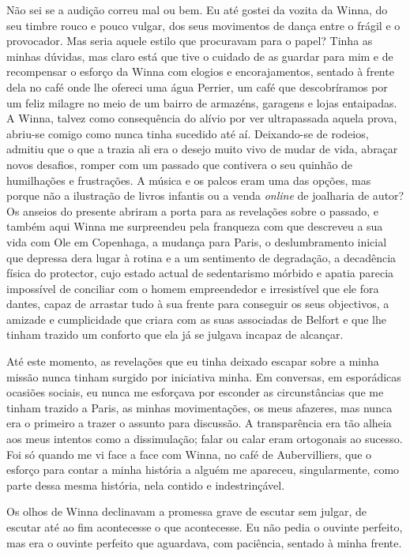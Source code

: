 Não sei se a audição correu mal ou bem. Eu até gostei da vozita da
Winna, do seu timbre rouco e pouco vulgar, dos seus movimentos de dança
entre o frágil e o provocador. Mas seria aquele estilo que procuravam
para o papel? Tinha as minhas dúvidas, mas claro está que tive o cuidado
de as guardar para mim e de recompensar o esforço da Winna com elogios e
encorajamentos, sentado à frente dela no café onde lhe ofereci uma água
Perrier, um café que descobríramos por um feliz milagre no meio de um
bairro de armazéns, garagens e lojas entaipadas. A Winna, talvez como
consequência do alívio por ver ultrapassada aquela prova, abriu-se
comigo como nunca tinha sucedido até aí. Deixando-se de rodeios, admitiu
que o que a trazia ali era o desejo muito vivo de mudar de vida,
abraçar novos desafios, romper com um passado que contivera o seu
quinhão de humilhações e frustrações. A música e os palcos eram uma das
opções, mas porque não a ilustração de livros infantis ou a venda
\emph{online }de joalharia de autor? Os anseios do presente abriram a
porta para as revelações sobre o passado, e também aqui Winna me
surpreendeu pela franqueza com que descreveu a sua vida com Ole em
Copenhaga, a mudança para Paris, o deslumbramento inicial que depressa
dera lugar à rotina e a um sentimento de degradação,
a decadência física do protector, cujo estado actual de
sedentarismo mórbido e apatia parecia impossível de conciliar com o
homem empreendedor e irresistível que ele fora dantes, capaz de arrastar
tudo à sua frente para conseguir os seus objectivos, a amizade e
cumplicidade que criara com as suas associadas de Belfort e que lhe
tinham trazido um conforto que ela já se julgava incapaz de alcançar.

Até este momento, as revelações que eu tinha deixado escapar sobre a
minha missão nunca tinham surgido por iniciativa minha. Em conversas,
em esporádicas ocasiões sociais, eu nunca me esforçava por esconder as
circunstâncias que me tinham trazido a Paris, as minhas movimentações,
os meus afazeres, mas nunca era o primeiro a trazer o assunto para discussão. A transparência era tão alheia aos meus intentos como a
dissimulação; falar ou calar eram ortogonais ao sucesso. Foi só quando
me vi face a face com Winna, no café de Aubervilliers, que o esforço
para contar a minha história a alguém me apareceu, singularmente, como
parte dessa mesma história, nela contido e indestrinçável.

Os olhos de Winna declinavam a promessa grave de escutar sem julgar, de
escutar até ao fim acontecesse o que acontecesse. Eu não pedia o ouvinte
perfeito, mas era o ouvinte perfeito que aguardava, com paciência,
sentado à minha frente.

